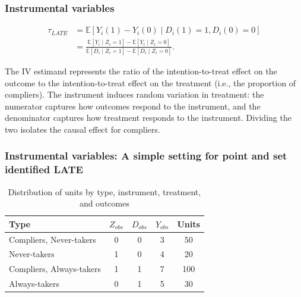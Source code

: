 \documentclass[12pt, compress]{beamer}
\begin{document}
\begin{frame}
	\frametitle{Instrumental variables}
\begin{align*}
	\tau_{LATE} 
	&= \mathbb{E}[Y_i(1)-Y_i(0)\mid D_i(1)=1, D_i(0)=0]\\
    &=\frac{\mathbb{E}[Y_i \mid Z_i = 1] - \mathbb{E}[Y_i \mid Z_i = 0]}{\mathbb{E}[D_i \mid Z_i = 1] - \mathbb{E}[D_i \mid Z_i = 0]}.
\end{align*}

The IV estimand represents the ratio of the intention-to-treat effect on the outcome to the intention-to-treat effect on the treatment (i.e., the proportion of compliers). The instrument induces random variation in treatment: the numerator captures how outcomes respond to the instrument, and the denominator captures how treatment responds to the instrument. Dividing the two isolates the causal effect for compliers.
\end{frame}

\begin{frame}
	\frametitle{Instrumental variables: A simple setting for point and set identified LATE}
\begin{table}[ht]
	\centering
	\caption{Distribution of units by type, instrument, treatment, and outcomes}
	\label{tab:types}
	\begin{tabular}{lcccc}
		\hline
		Type & $Z_{obs}$ & $D_{obs}$ & $Y_{obs}$ & Units \\
		\hline
		Compliers, Never-takers & 0 & 0 & 3 & 50 \\
		Never-takers   & 1 & 0 & 4 & 20  \\
		Compliers, Always-takers & 1 & 1 & 7 & 100  \\
		 Always-takers   & 0 & 1 & 5 & 30  \\
		\hline
	\end{tabular}
\end{table}
\end{frame}
\end{document}
